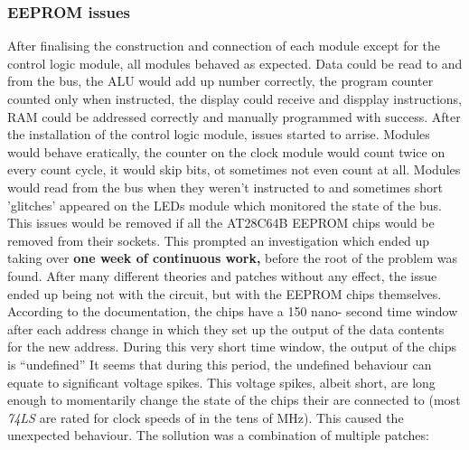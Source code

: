 \subsubsection{EEPROM issues}
After finalising the construction and connection of each module except for the control logic
module, all modules behaved as expected. Data could be read to and from the bus, the ALU would add
up number correctly, the program counter counted only when instructed, the display could receive
and dispplay instructions, RAM could be addressed correctly and manually programmed with success.
After the installation of the control logic module, issues started to arrise. Modules would
behave eratically, the counter on the clock module would count twice on every count cycle, it
would skip bits, ot sometimes not even count at all. Modules would read from the bus when they
weren't instructed to and sometimes short 'glitches' appeared on the LEDs module which monitored
the state of the bus. This issues would be removed if all the AT28C64B \cite{at28c64b} EEPROM
chips would be removed from their sockets. This prompted an investigation which ended up taking
over \textbf{one week of continuous work,} before the root of the problem was found. After many
different theories and patches without any effect, the issue ended up being not with the circuit,
but with the EEPROM chips themselves. According to the documentation, the chips have a 150 nano-
second time window after each address change in which they set up the output of the data contents
for the new address. During this very short time window, the output of the chips is
``undefined'' It seems that during this period, the undefined behaviour can equate to
significant voltage spikes. This voltage spikes, albeit short, are long enough to momentarily
change the state of the chips their are connected to (most \emph{74LS} are rated for clock speeds
of in the tens of MHz). This caused the unexpected behaviour. The sollution was a combination of
multiple patches:
